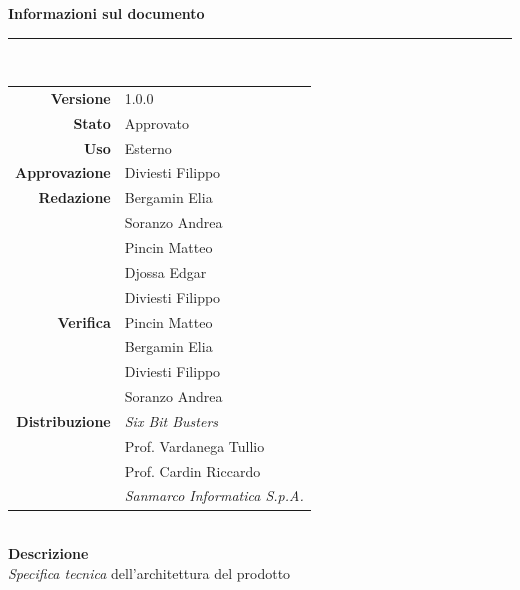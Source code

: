 \begin{titlepage}
\begin{center}
	\large \textbf{Informazioni sul documento} \\
	\rule{0.6\textwidth}{0.4pt}
	\\[0.5cm]
	\begin{tabular}{r|l}
		\textbf{Versione} & 1.0.0\\
		\textbf{Stato} & Approvato\\
		\textbf{Uso} & Esterno\\                         
		\textbf{Approvazione} & Diviesti Filippo\\                      
		\textbf{Redazione} & Bergamin Elia \\ & Soranzo Andrea \\ & Pincin Matteo \\ & Djossa Edgar \\ & Diviesti Filippo \\
		\textbf{Verifica} & Pincin Matteo \\ & Bergamin Elia \\ & Diviesti Filippo \\ & Soranzo Andrea\\                    
		\textbf{Distribuzione} & \textit{Six Bit Busters} \\ & Prof. Vardanega Tullio \\ & Prof. Cardin Riccardo \\ & \textit{Sanmarco Informatica S.p.A.}
	\end{tabular}	
	\\[0.8cm]

	\large \textbf{Descrizione} \\ \textit{Specifica tecnica} dell'architettura del prodotto
	
	\end{center}
\end{titlepage}
